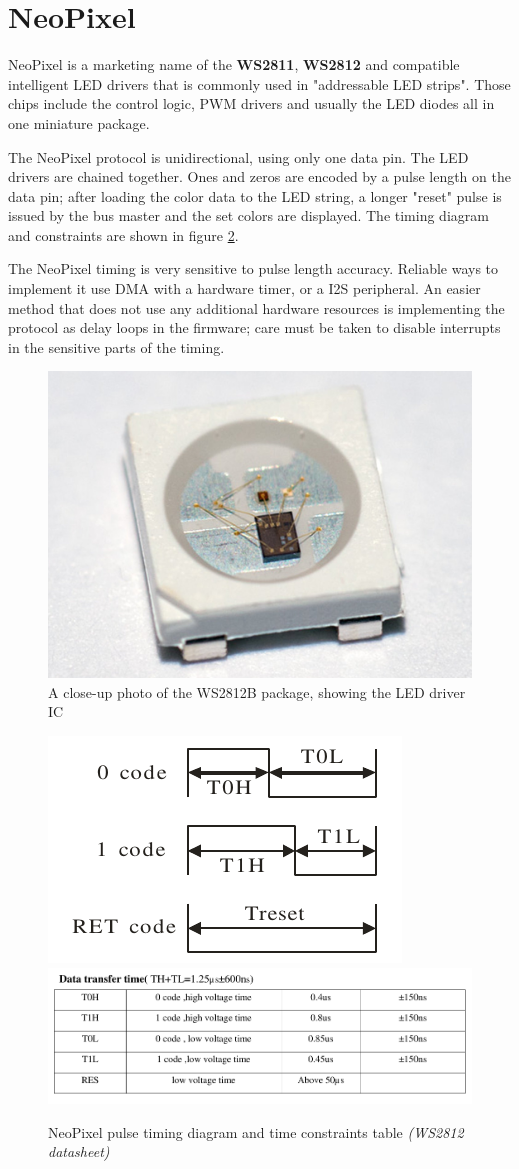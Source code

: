 \section{NeoPixel} \label{sec:theory-neo}

NeoPixel is a marketing name of the \textbf{WS2811}, \textbf{WS2812} and compatible intelligent LED drivers that is commonly used in "addressable LED strips". Those chips include the control logic, PWM drivers and usually the LED diodes all in one miniature package.

The NeoPixel protocol is unidirectional, using only one data pin. The LED drivers are chained together. Ones and zeros are encoded by a pulse length on the data pin; after loading the color data to the LED string, a longer "reset" pulse is issued by the bus master and the set colors are displayed. The timing diagram and constraints are shown in figure \ref{fig:ws2812-dia}.

The NeoPixel timing is very sensitive to pulse length accuracy. Reliable ways to implement it use DMA with a hardware timer, or a I2S peripheral. An easier method that does not use any additional hardware resources is implementing the protocol as delay loops in the firmware; care must be taken to disable interrupts in the sensitive parts of the timing.

\begin{figure}
	\centering
	\includegraphics[width=.6\textwidth] {img/ws2812b-detail.jpg}
	\caption{\label{fig:ws2812-detail}A close-up photo of the WS2812B package, showing the LED driver IC}
\end{figure}

\begin{figure}
	\centering
	\includegraphics[width=.4\textwidth] {img/neo-diagram.png}
	\includegraphics[width=\textwidth] {img/neo-lengths.png}
	\caption{\label{fig:ws2812-dia}NeoPixel pulse timing diagram and time constraints table \textit{(WS2812 datasheet)}}
\end{figure}
